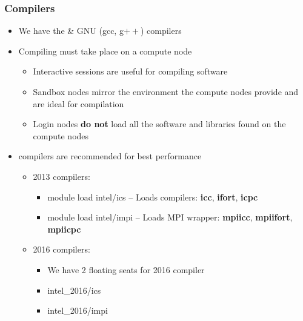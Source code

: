 \begin{frame}
\frametitle{Compilers}
	\begin{itemize}
		\item We have the {\intel} \& GNU (gcc, g$++$) compilers
		\item Compiling must take place on a compute node
		\begin{itemize}
			\item Interactive sessions are useful for compiling software
			\item Sandbox nodes mirror the environment the compute nodes provide and are ideal for compilation
			\item Login nodes \textbf{do not} load all the software and libraries found on the compute nodes
		\end{itemize}
		\item {\intel} compilers are recommended for best performance
		\begin{itemize}
			\item {\intel} 2013 compilers:
			\begin{itemize}
				\item module load intel/ics -- Loads {\intel} compilers: {\tiny \textbf{icc}, \textbf{ifort}, \textbf{icpc}}
				\item module load intel/impi -- Loads {\intel} MPI wrapper: {\tiny\textbf{mpiicc}, \textbf{mpiifort}, \textbf{mpiicpc}}
			\end{itemize}
			\item {\intel} 2016 compilers:
			\begin{itemize}
				\item We have 2 floating seats for {\intel} 2016 compiler
				\item intel\_2016/ics 
				\item intel\_2016/impi 
			\end{itemize}
		\end{itemize}			
	\end{itemize}
\end{frame}


